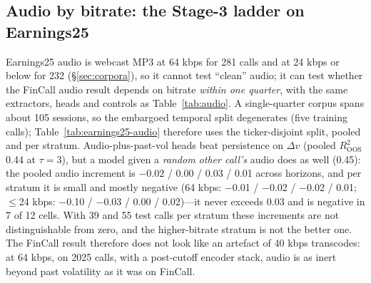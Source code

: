

\subsection{Audio by bitrate: the Stage-3 ladder on Earnings25}
\label{sec:results-clean-audio}
Earnings25 audio is webcast MP3 at 64 kbps for 281 calls and at 24 kbps or
below for 232 (\S\ref{sec:corpora}), so it cannot test ``clean'' audio; it can
test whether the FinCall audio result depends on bitrate \emph{within one quarter},
with the same extractors, heads and controls as Table~\ref{tab:audio}. A
single-quarter corpus spans about 105 sessions, so the embargoed temporal split
degenerates (five training calls); Table~\ref{tab:earnings25-audio} therefore uses
the ticker-disjoint split, pooled and per stratum. Audio-plus-past-vol heads beat
persistence on $\Delta v$ (pooled $R^2_{\mathrm{OOS}}$ 0.44 at $\tau{=}3$), but a
model given a \emph{random other call's} audio does as well (0.45): the pooled
audio increment is $-0.02$ / 0.00 / 0.03 / 0.01 across horizons, and per stratum
it is small and mostly negative (64 kbps: $-$0.01 / $-$0.02 / $-$0.02 / 0.01;
$\le$24 kbps: $-$0.10 / $-$0.03 / 0.00 / 0.02)---it never exceeds 0.03 and is
negative in 7 of 12 cells. With 39 and 55 test calls per stratum these
increments are not distinguishable from zero, and the higher-bitrate stratum is
not the better one. The FinCall result therefore does not look like an artefact
of 40 kbps transcodes: at 64 kbps, on 2025 calls, with a post-cutoff encoder
stack, audio is as inert beyond past volatility as it was on FinCall.



